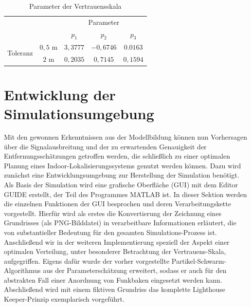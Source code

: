 \begin{table}[H]
\begin{center}
\begin{tabular}{|c|c|c|c|c|}
\cline{3-5}
\multicolumn{2}{c|}{} & \multicolumn{3}{c|}{Parameter} \\
\cline{3-5}
\multicolumn{2}{c|}{} & $p_1$ & $p_2$ & $p_3$ \\
\hline
\multirow{2}{*}{Toleranz} & $0,5$ m & $3,3777$ & $-0,6746$ & $0.0163$\\
\cline{2-5}
& $2$ m & $0,2035$ & $0,7145$ & $0,1594$\\
\hline
\end{tabular}
\end{center}
\caption{Parameter der Vertrauensskala}
\label{tab:ParameterwerteGuete}
\end{table} 
\section{Entwicklung der Simulationsumgebung}
Mit den gewonnen Erkenntnissen aus der Modellbildung können nun Vorhersagen über die Signalausbreitung und der zu erwartenden Genauigkeit der Entfernungsschätzungen getroffen werden, die schließlich zu einer optimalen Planung eines Indoor-Lokalisierungssystems genutzt werden können. Dazu wird zunächst eine Entwicklungsumgebung zur Herstellung der Simulation benötigt. Als Basis der Simulation wird eine grafische Oberfläche (GUI) mit dem Editor GUIDE erstellt, der Teil des Programmes MATLAB \cite{GUIDE} ist. In dieser Sektion werden die einzelnen Funktionen der GUI besprochen und deren Verarbeitungskette vorgestellt. Hierfür wird als erstes die Konvertierung der Zeichnung eines Grundrisses (als PNG-Bilddatei) in verarbeitbare Informationen erläutert, die von substantieller Bedeutung für den gesamten Simulations-Prozess ist. Anschließend wir in der weiteren Implementierung speziell der Aspekt einer optimalen Verteilung, unter besonderer Betrachtung der Vertrauens-Skala, aufgegriffen. Eigens dafür wurde der vorher vorgestellte Partikel-Schwarm-Algorithmus aus der Parameterschätzung erweitert, sodass er auch für den abstrakten Fall einer Anordnung von Funkbaken eingesetzt werden kann. Abschließend wird mit einem fiktiven Grundriss das komplette Lighthouse Keeper-Prinzip exemplarisch vorgeführt.  
